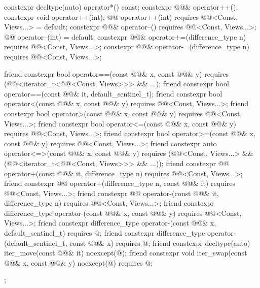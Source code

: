 \begin{codeblock}
{{    constexpr decltype(auto) operator*() const;
    constexpr @@& operator++();
    constexpr void operator++(int);
    @@ operator++(int)
      requires @@<Const, Views...> = default;
    constexpr @@& operator--()
      requires @@<Const, Views...>;
    @@ operator--(int) = default;
    constexpr @@& operator+=(difference_type n)
      requires @@<Const, Views...>;
    constexpr @@& operator-=(difference_type n)
      requires @@<Const, Views...>;

    friend constexpr bool operator==(const @@& x, const @@& y)
      requires (@@<iterator_t<@@<Const, Views>>> && ...);
    friend constexpr bool operator==(const @@& it, default_sentinel_t);
    friend constexpr bool operator<(const @@& x, const @@& y)
      requires @@<Const, Views...>;
    friend constexpr bool operator>(const @@& x, const @@& y)
      requires @@<Const, Views...>;
    friend constexpr bool operator<=(const @@& x, const @@& y)
      requires @@<Const, Views...>;
    friend constexpr bool operator>=(const @@& x, const @@& y)
      requires @@<Const, Views...>;
    friend constexpr auto operator<=>(const @@& x, const @@& y)
      requires (@@<Const, Views...> &&
                (@@<iterator_t<@@<Const, Views>>> && ...));
    friend constexpr @@ operator+(const @@& it, difference_type n)
      requires @@<Const, Views...>;
    friend constexpr @@ operator+(difference_type n, const @@& it)
      requires @@<Const, Views...>;
    friend constexpr @@ operator-(const @@& it, difference_type n)
      requires @@<Const, Views...>;
    friend constexpr difference_type operator-(const @@& x, const @@& y)
      requires @@<Const, Views...>;
    friend constexpr difference_type operator-(const @@& x, default_sentinel_t)
      requires @\seebelow@;
    friend constexpr difference_type operator-(default_sentinel_t, const @@& x)
      requires @\seebelow@;
    friend constexpr decltype(auto) iter_move(const @@& it) noexcept(@\seebelow@);
    friend constexpr void iter_swap(const @@& x, const @@& y) noexcept(@\seebelow@)
      requires @\seebelow@;
  };
}
\end{codeblock}

